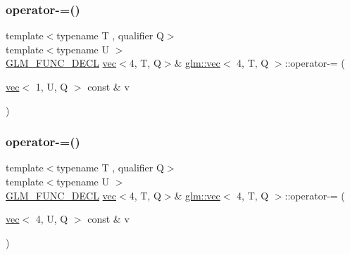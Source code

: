 \subsubsection{\texorpdfstring{operator-\/=()}{operator-=()}\hspace{0.1cm}{\footnotesize\ttfamily [2/6]}}
{\footnotesize\ttfamily template$<$typename T , qualifier Q$>$ \\
template$<$typename U $>$ \\
\hyperlink{setup_8hpp_ab2d052de21a70539923e9bcbf6e83a51}{G\+L\+M\+\_\+\+F\+U\+N\+C\+\_\+\+D\+E\+CL} \hyperlink{structglm_1_1vec}{vec}$<$4, T, Q$>$\& \hyperlink{structglm_1_1vec}{glm\+::vec}$<$ 4, T, Q $>$\+::operator-\/= (\begin{DoxyParamCaption}\item[{\hyperlink{structglm_1_1vec}{vec}$<$ 1, U, Q $>$ const \&}]{v }\end{DoxyParamCaption})}

\mbox{\label{structglm_1_1vec_3_014_00_01_t_00_01_q_01_4_a6c7121aa85c158912c509760cf65da75}} 
\subsubsection{\texorpdfstring{operator-\/=()}{operator-=()}\hspace{0.1cm}{\footnotesize\ttfamily [3/6]}}
{\footnotesize\ttfamily template$<$typename T , qualifier Q$>$ \\
template$<$typename U $>$ \\
\hyperlink{setup_8hpp_ab2d052de21a70539923e9bcbf6e83a51}{G\+L\+M\+\_\+\+F\+U\+N\+C\+\_\+\+D\+E\+CL} \hyperlink{structglm_1_1vec}{vec}$<$4, T, Q$>$\& \hyperlink{structglm_1_1vec}{glm\+::vec}$<$ 4, T, Q $>$\+::operator-\/= (\begin{DoxyParamCaption}\item[{\hyperlink{structglm_1_1vec}{vec}$<$ 4, U, Q $>$ const \&}]{v }\end{DoxyParamCaption})}

\mbox{\label{structglm_1_1vec_3_014_00_01_t_00_01_q_01_4_aea3f23ac07ef99b7189102d95bf26a85}} 
